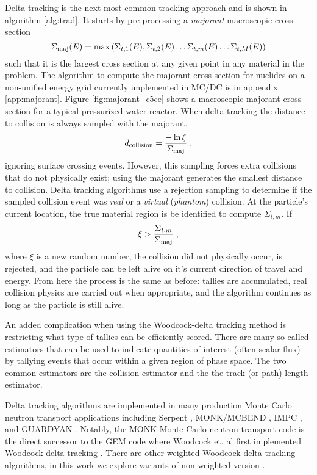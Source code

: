 Delta tracking is the next most common tracking approach and is shown in algorithm \ref{alg:trad}.
It starts by pre-processing a \textit{majorant} macroscopic cross-section
\begin{equation}
    \Sigma_{\text{maj}}(E) = \max\left({\Sigma_{t,1}(E), \Sigma_{t,2}(E) \dots \Sigma_{t,m}(E) \dots \Sigma_{t,M}(E)}\right)
\end{equation}
such that it is the largest cross section at any given point in any material in the problem.
The algorithm to compute the majorant cross-section for nuclides on a non-unified energy grid currently implemented in MC/DC is in appendix \ref{app:majorant}.
Figure \ref{fig:majorant_c5ce} shows a macroscopic majorant cross section for a typical pressurized water reactor.
When delta tracking the distance to collision is always sampled with the majorant,
\begin{equation}
    d_{\text{collision}} = \frac{-\ln{\xi}}{\Sigma_{\text{maj}}} \; ,
\end{equation}
ignoring surface crossing events.
However, this sampling forces extra collisions that do not physically exist; using the majorant generates the smallest distance to collision.
Delta tracking algorithms use a rejection sampling to determine if the sampled collision event was \textit{real} or a \textit{virtual} (\textit{phantom}) collision.
At the particle's current location, the true material region is be identified to compute $\Sigma_{t,m}$.
If 
\begin{equation}
    \xi > \frac{\Sigma_{t,m}}{\Sigma_{\text{maj}}} \; ,
\end{equation}
where $\xi$ is a new random number, the collision did not physically occur, is rejected, and the particle can be left alive on it's current direction of travel and energy.
From here the process is the same as before: tallies are accumulated, real collision physics are carried out when appropriate, and the algorithm continues as long as the particle is still alive.

An added complication when using the Woodcock-delta tracking method is restricting what type of tallies can be efficiently scored.
There are many so called estimators that can be used to indicate quantities of interest (often scalar flux) by tallying events that occur within a given region of phase space.
The two common estimators are the collision estimator and the the track (or path) length estimator.

Delta tracking algorithms are implemented in many production Monte Carlo neutron transport applications including Serpent \cite{leppanen_2010_burnup, leppanen_use_2017, leppanen_development_2013, leppanen_2015_serpent}, MONK/MCBEND \cite{richards_monk_2015}, IMPC \cite{fang_development_2022}, and GUARDYAN \cite{molnar_gpu_based_2019}.
Notably, the MONK Monte Carlo neutron transport code is the direct successor to the GEM code where Woodcock et. al first implemented Woodcock-delta tracking \cite{woodcock_techniques_1965}.
There are other weighted Woodcock-delta tracking algorithms, in this work we explore variants of non-weighted version \cite{molnar_variance_2018, morgan_weighted-delta-tracking_2015}.

